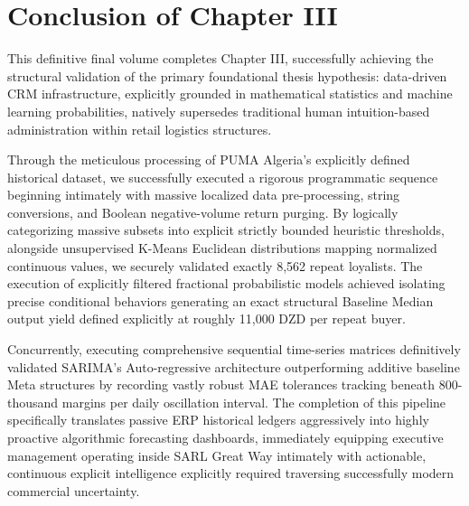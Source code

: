 \documentclass[12pt,a4paper]{report}
\begin{document}
\section*{Conclusion of Chapter III}
This definitive final volume completes Chapter III, successfully achieving the structural validation of the primary foundational thesis hypothesis: data-driven CRM infrastructure, explicitly grounded in mathematical statistics and machine learning probabilities, natively supersedes traditional human intuition-based administration within retail logistics structures.

Through the meticulous processing of PUMA Algeria's explicitly defined historical dataset, we successfully executed a rigorous programmatic sequence beginning intimately with massive localized data pre-processing, string conversions, and Boolean negative-volume return purging. By logically categorizing massive subsets into explicit strictly bounded heuristic thresholds, alongside unsupervised K-Means Euclidean distributions mapping normalized continuous values, we securely validated exactly 8,562 repeat loyalists. The execution of explicitly filtered fractional probabilistic models achieved isolating precise conditional behaviors generating an exact structural Baseline Median output yield defined explicitly at roughly 11,000 DZD per repeat buyer. 

Concurrently, executing comprehensive sequential time-series matrices definitively validated SARIMA’s Auto-regressive architecture outperforming additive baseline Meta structures by recording vastly robust MAE tolerances tracking beneath 800-thousand margins per daily oscillation interval. The completion of this pipeline specifically translates passive ERP historical ledgers aggressively into highly proactive algorithmic forecasting dashboards, immediately equipping executive management operating inside SARL Great Way intimately with actionable, continuous explicit intelligence explicitly required traversing successfully modern commercial uncertainty.
\end{document}
